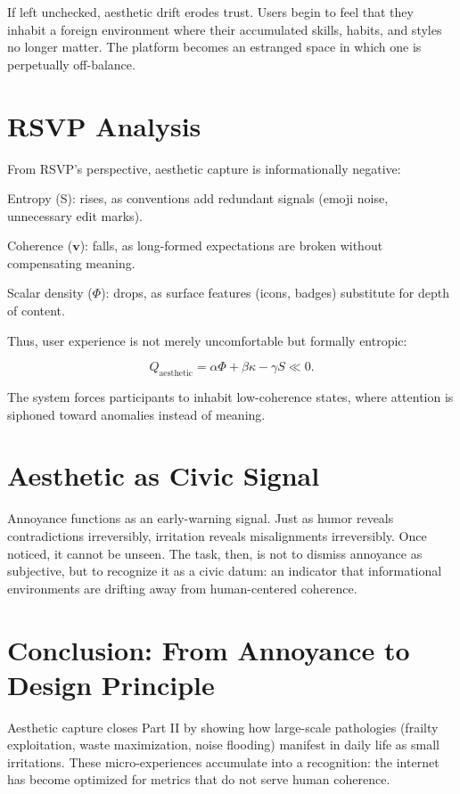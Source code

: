 \documentclass{book}
\begin{document}
If left unchecked, aesthetic drift erodes trust. Users begin to feel that they inhabit a foreign environment where their accumulated skills, habits, and styles no longer matter. The platform becomes an estranged space in which one is perpetually off-balance.

\section{RSVP Analysis}

From RSVP’s perspective, aesthetic capture is informationally negative:

Entropy (S): rises, as conventions add redundant signals (emoji noise, unnecessary edit marks).

Coherence (\(\mathbf{v}\)): falls, as long-formed expectations are broken without compensating meaning.

Scalar density (\(\Phi\)): drops, as surface features (icons, badges) substitute for depth of content.

Thus, user experience is not merely uncomfortable but formally entropic:

\[ Q_{\text{aesthetic}} = \alpha \Phi + \beta \kappa - \gamma S \ll 0. \]

The system forces participants to inhabit low-coherence states, where attention is siphoned toward anomalies instead of meaning.

\section{Aesthetic as Civic Signal}

Annoyance functions as an early-warning signal. Just as humor reveals contradictions irreversibly, irritation reveals misalignments irreversibly. Once noticed, it cannot be unseen. The task, then, is not to dismiss annoyance as subjective, but to recognize it as a civic datum: an indicator that informational environments are drifting away from human-centered coherence.

\section{Conclusion: From Annoyance to Design Principle}

Aesthetic capture closes Part II by showing how large-scale pathologies (frailty exploitation, waste maximization, noise flooding) manifest in daily life as small irritations. These micro-experiences accumulate into a recognition: the internet has become optimized for metrics that do not serve human coherence.
\end{document}
